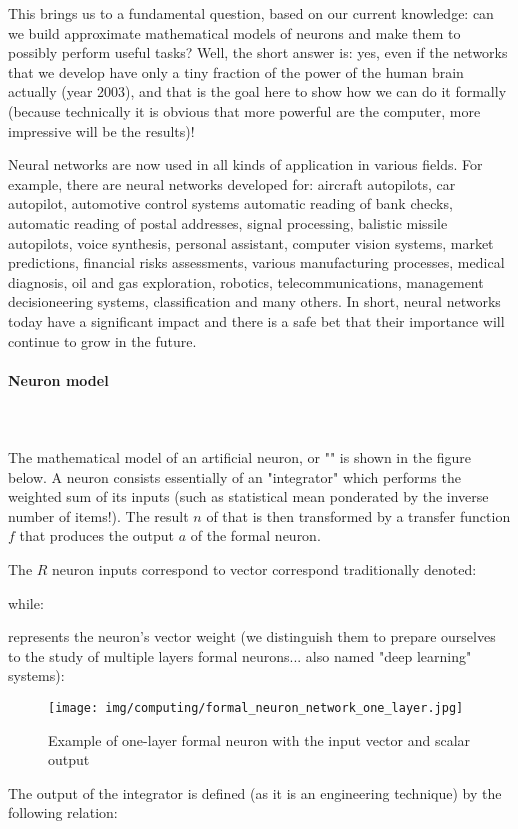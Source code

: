 	This brings us to a fundamental question, based on our current knowledge: can we build approximate mathematical models of neurons and make them to possibly perform useful tasks? Well, the short answer is: yes, even if the networks that we develop have only a tiny fraction of the power of the human brain actually (year 2003), and that is the goal here to show how we can do it formally (because technically it is obvious that more powerful are the computer, more impressive will be the results)!
	
	Neural networks are now used in all kinds of application in various fields. For example, there are neural networks developed for: aircraft autopilots, car autopilot, automotive control systems automatic reading of bank checks, automatic reading of postal addresses, signal processing, balistic missile autopilots, voice synthesis, personal assistant, computer vision systems, market predictions, financial risks assessments, various manufacturing processes, medical diagnosis, oil and gas exploration, robotics, telecommunications, management decisioneering systems, classification and many others. In short, neural networks today have a significant impact and there is a safe bet that their importance will continue to grow in the future.
	
	\paragraph{Neuron model}\mbox{}\\\\
	The mathematical model of an artificial neuron, or "" is shown in the figure below. A neuron consists essentially of an "integrator" which performs the weighted sum of its inputs (such as statistical mean ponderated by the inverse number of items!). The result $n$ of that is then transformed by a transfer function $f$ that produces the output $a$ of the formal neuron.

	The $R$ neuron inputs  correspond to vector correspond traditionally denoted:
	
	while:
	
	represents the neuron's vector weight (we distinguish them to prepare ourselves to the study of multiple layers formal neurons... also named "deep learning" systems):
	\begin{figure}[H]
		\centering
		\texttt{[image: img/computing/formal\_neuron\_network\_one\_layer.jpg]}
		\caption{Example of one-layer formal neuron with the input vector and scalar output}
	\end{figure}
	The output of the integrator is defined (as it is an engineering technique) by the following relation:
	
